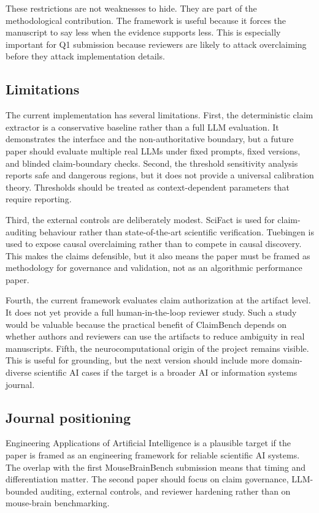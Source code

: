 These restrictions are not weaknesses to hide. They are part of the methodological contribution. The framework is useful because it forces the manuscript to say less when the evidence supports less. This is especially important for Q1 submission because reviewers are likely to attack overclaiming before they attack implementation details.

\subsection{Limitations}
\label{subsec:limitations}

The current implementation has several limitations. First, the deterministic claim extractor is a conservative baseline rather than a full LLM evaluation. It demonstrates the interface and the non-authoritative boundary, but a future paper should evaluate multiple real LLMs under fixed prompts, fixed versions, and blinded claim-boundary checks. Second, the threshold sensitivity analysis reports safe and dangerous regions, but it does not provide a universal calibration theory. Thresholds should be treated as context-dependent parameters that require reporting.

Third, the external controls are deliberately modest. SciFact is used for claim-auditing behaviour rather than state-of-the-art scientific verification. Tuebingen is used to expose causal overclaiming rather than to compete in causal discovery. This makes the claims defensible, but it also means the paper must be framed as methodology for governance and validation, not as an algorithmic performance paper.

Fourth, the current framework evaluates claim authorization at the artifact level. It does not yet provide a full human-in-the-loop reviewer study. Such a study would be valuable because the practical benefit of ClaimBench depends on whether authors and reviewers can use the artifacts to reduce ambiguity in real manuscripts. Fifth, the neurocomputational origin of the project remains visible. This is useful for grounding, but the next version should include more domain-diverse scientific AI cases if the target is a broader AI or information systems journal.

\subsection{Journal positioning}
\label{subsec:journal-positioning}

Engineering Applications of Artificial Intelligence is a plausible target if the paper is framed as an engineering framework for reliable scientific AI systems. The overlap with the first MouseBrainBench submission means that timing and differentiation matter. The second paper should focus on claim governance, LLM-bounded auditing, external controls, and reviewer hardening rather than on mouse-brain benchmarking.

